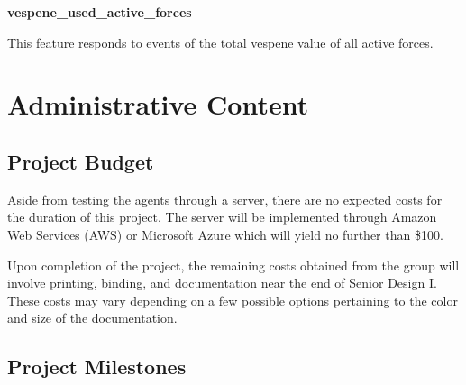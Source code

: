 \documentclass[a4paper,12pt]{report}
\newcommand{\msection}[1]{\noindent\textbf{#1}}
\begin{document}
\msection{vespene\_used\_active\_forces}

This feature responds to events of the total vespene value of all active forces.


\chapter{Administrative Content}
\section{Project Budget}

Aside from testing the agents through a server, there are no expected costs for the duration of this project. The server will be implemented through Amazon Web Services (AWS) or Microsoft Azure which will yield no further than \$100.

Upon completion of the project, the remaining costs obtained from the group will involve printing, binding, and documentation near the end of Senior Design I. These costs may vary depending on a few possible options pertaining to the color and size of the documentation.

\section{Project Milestones}
\end{document}
